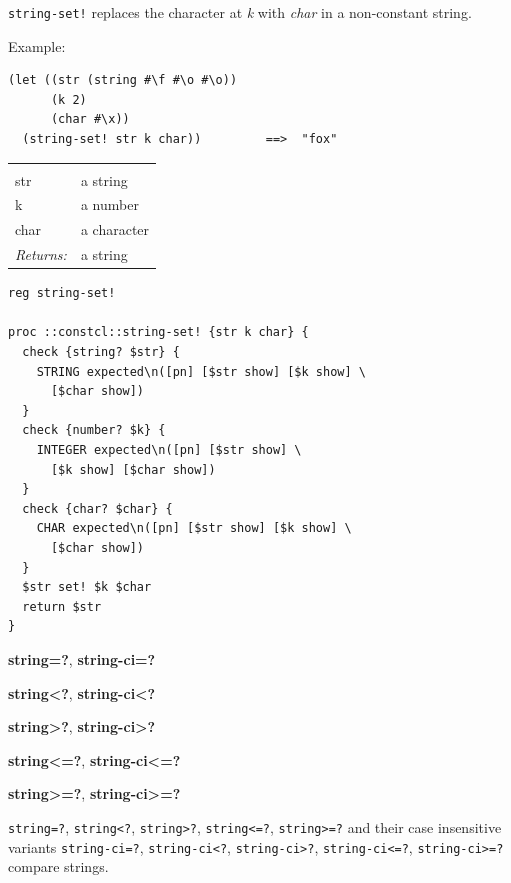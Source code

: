 \documentclass[twoside,9pt]{report}
\begin{document}
\texttt{string-set!} replaces the character at \emph{k} with \emph{char} in a non-constant string.



Example:

\begin{verbatim}
(let ((str (string #\f #\o #\o))
      (k 2)
      (char #\x))
  (string-set! str k char))         ==>  "fox"
\end{verbatim}
\noindent\begin{tabular}{ |p{1.9cm} p{8cm}| }
\hline
\rowcolor[HTML]{CCCCCC} \multicolumn{2}{|l|}{\bf string-set! (public)} \\
str & a string \\
k & a number \\
char & a character \\
\textit{Returns:} & a string \\
\hline
\end{tabular}
\begin{lstlisting}
reg string-set!

proc ::constcl::string-set! {str k char} {
  check {string? $str} {
    STRING expected\n([pn] [$str show] [$k show] \
      [$char show])
  }
  check {number? $k} {
    INTEGER expected\n([pn] [$str show] \
      [$k show] [$char show])
  }
  check {char? $char} {
    CHAR expected\n([pn] [$str show] [$k show] \
      [$char show])
  }
  $str set! $k $char
  return $str
}
\end{lstlisting}


\textbf{string=?}, \textbf{string-ci=?}


\textbf{string<?}, \textbf{string-ci<?}


\textbf{string>?}, \textbf{string-ci>?}


\textbf{string<=?}, \textbf{string-ci<=?}


\textbf{string>=?}, \textbf{string-ci>=?}


\texttt{string=?}, \texttt{string<?}, \texttt{string>?}, \texttt{string<=?}, \texttt{string>=?} and their case insensitive variants \texttt{string-ci=?}, \texttt{string-ci<?}, \texttt{string-ci>?}, \texttt{string-ci<=?}, \texttt{string-ci>=?} compare strings.
\end{document}
